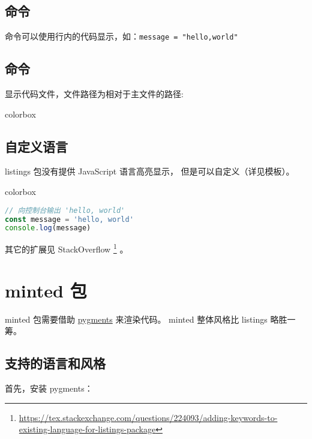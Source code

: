 \subsection{\protect{} 命令}

 命令可以使用行内的代码显示，如：\texttt{\lstinline|message = "hello,world"|}

\subsection{\protect{} 命令}

显示代码文件，文件路径为相对于主文件的路径:

\begin{latexcode}{colorbox}

\end{latexcode}

\subsection{自定义语言}

listings 包没有提供 JavaScript 语言高亮显示， 但是可以自定义（详见模板）。

\begin{latexcode}{colorbox}
\begin{lstlisting}[language=js,caption={JavaScript 语言}]
// 向控制台输出 'hello, world'
const message = 'hello, world'
console.log(message)
\end{lstlisting}
\end{latexcode}

其它的扩展见 StackOverflow
\footnote{\url{https://tex.stackexchange.com/questions/224093/adding-keywords-to-existing-language-for-listings-package}}
。

\section{minted 包}

minted 包需要借助 \href{https://pygments.org/}{pygments} 来渲染代码。
minted 整体风格比 listings 略胜一筹。

\subsection{支持的语言和风格}

首先，安装 pygments：

